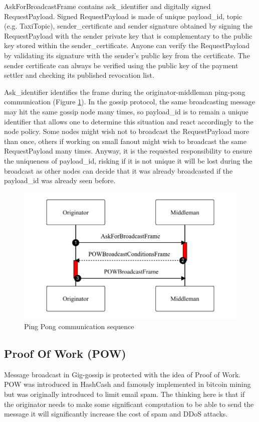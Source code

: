 \documentclass{article}
\begin{document}
AskForBroadcastFrame contains ask\_identifier and digitally signed RequestPayload. Signed RequestPayload is made of unique payload\_id, topic (e.g. TaxiTopic), sender\_certificate and sender signature obtained by signing the RequestPayload with the sender private key that is complementary to the public key stored within the sender\_certificate. Anyone can verify the RequestPayload by validating its signature with the sender's public key from the certificate. The sender certificate can always be verified using the public key of the payment settler and checking its published revocation list.

Ask\_identifier identifies the frame during the originator-middleman ping-pong communication (Figure \ref{fig:fr:pingpong}). In the gossip protocol, the same broadcasting message may hit the same gossip node many times, so payload\_id is to remain a unique identifier that allows one to determine this situation and react accordingly to the node policy. Some nodes might wish not to broadcast the RequestPayload more than once, others if working on small fanout might wish to broadcast the same RequestPayload many times. Anyway, it is the requested responsibility to ensure the uniqueness of payload\_id, risking if it is not unique it will be lost during the broadcast as other nodes can decide that it was already broadcasted if the payload\_id was already seen before.


\begin{figure}
	\centering
	\includegraphics[scale=0.7]{PingPong.pdf}
	\caption{Ping Pong communication sequence}
	\label{fig:fr:pingpong}
\end{figure}

\subsection{Proof Of Work (POW)}
Message broadcast in Gig-gossip is protected with the idea of Proof of Work. POW was introduced in HashCash \cite{Hashcash} and famously implemented in bitcoin mining but was originally introduced to limit email spam. The thinking here is that if the originator needs to make some significant computation to be able to send the message it will significantly increase the cost of spam and DDoS attacks. 
\end{document}
